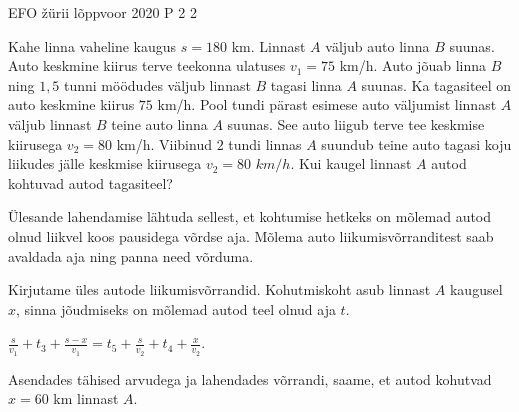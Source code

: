 {EFO žürii} %
{lõppvoor} %
{2020} %
{P 2} %
{2} %
{

\ifStatement
Kahe linna vaheline kaugus $s = 180$ km. Linnast $A$ väljub auto linna $B$ suunas. Auto keskmine kiirus terve teekonna ulatuses $v_1 = 75$ km/h. Auto jõuab linna $B$ ning $1,5$ tunni möödudes väljub linnast $B$ tagasi linna $A$ suunas. Ka tagasiteel on auto keskmine kiirus $75$ km/h. Pool tundi pärast esimese auto väljumist linnast $A$ väljub linnast $B$ teine auto linna $A$ suunas. See auto liigub terve tee keskmise kiirusega $v_2 = 80$ km/h. Viibinud $2$ tundi linnas $A$ suundub teine auto tagasi koju liikudes jälle keskmise kiirusega $v_2 = 80$ $km/h$. Kui kaugel linnast $A$ autod kohtuvad autod tagasiteel? 
\fi

\ifHint
Ülesande lahendamise lähtuda sellest, et kohtumise hetkeks on mõlemad autod olnud liikvel koos pausidega võrdse aja. Mõlema auto liikumisvõrranditest saab avaldada aja ning panna need võrduma.
\fi

\ifSolution
Kirjutame üles autode liikumisvõrrandid. Kohutmiskoht asub linnast $A$ kaugusel $x$, sinna jõudmiseks on mõlemad autod teel olnud aja $t$.
\begin{center}
$\frac{s}{v_1} + t_3 + \frac{s - x}{v_1} = t_5 + \frac{s}{v_2} + t_4 + \frac{x}{v_2}$.
\end{center}
Asendades tähised arvudega ja lahendades võrrandi, saame, et autod kohutvad $x = 60$ km linnast $A$.
\fi
}
